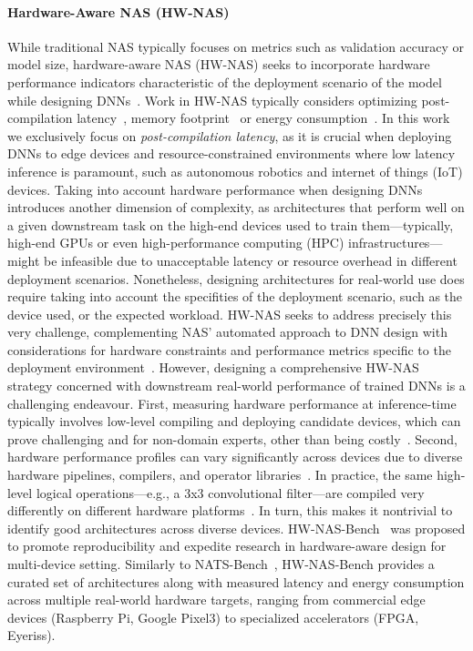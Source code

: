 \paragraph{Hardware-Aware NAS (HW-NAS)}
While traditional NAS typically focuses on metrics such as validation accuracy or model size, hardware-aware NAS (HW-NAS) seeks to incorporate hardware performance indicators characteristic of the deployment scenario of the model while designing DNNs~\citep{benmeziane2023efficient}. 
Work in HW-NAS typically considers optimizing post-compilation latency~\citep{wu2019fbnet}, memory footprint~\citep{king2025micronas} or energy consumption~\citep{speckhard2022neural}. In this work we exclusively focus on \emph{post-compilation latency}, as it is crucial when deploying DNNs to edge devices and resource-constrained environments where low latency inference is paramount, such as autonomous robotics and internet of things (IoT) devices. 
Taking into account hardware performance when designing DNNs introduces another dimension of complexity, as architectures that perform well on a given downstream task on the high-end devices used to train them---typically, high-end GPUs or even high-performance computing (HPC) infrastructures---might be infeasible due to unacceptable latency or resource overhead in different deployment scenarios. 
Nonetheless, designing architectures for real-world use does require taking into account the specifities of the deployment scenario, such as the device used, or the expected workload. HW-NAS seeks to address precisely this very challenge, complementing NAS' automated approach to DNN design with considerations for hardware constraints and performance metrics specific to the deployment environment~\citep{li2021hw}.
However, designing a comprehensive HW-NAS strategy concerned with downstream real-world performance of trained DNNs is a challenging endeavour. 
First, measuring hardware performance at inference-time typically involves low-level compiling and deploying candidate devices, which can prove challenging and for non-domain experts, other than being costly~\citep{li2021hw}.
Second, hardware performance profiles can vary significantly across devices due to diverse hardware pipelines, compilers, and operator libraries~\citep{li2021hw,benmeziane2023efficient}.
In practice, the same high-level logical operations---e.g., a 3x3 convolutional filter---are compiled very differently on different hardware platforms~\citep{li2021hw,benmeziane2023efficient,laube2022expect}. In turn, this makes it nontrivial to identify good architectures across diverse devices.
HW-NAS-Bench~\citep{li2021hw} was proposed to promote reproducibility and expedite research in hardware-aware design for multi-device setting. 
Similarly to NATS-Bench~\citep{dong2021nats}, HW-NAS-Bench provides a curated set of architectures along with measured latency and energy consumption across multiple real-world hardware targets, ranging from commercial edge devices (Raspberry Pi, Google Pixel3) to specialized accelerators (FPGA, Eyeriss).

